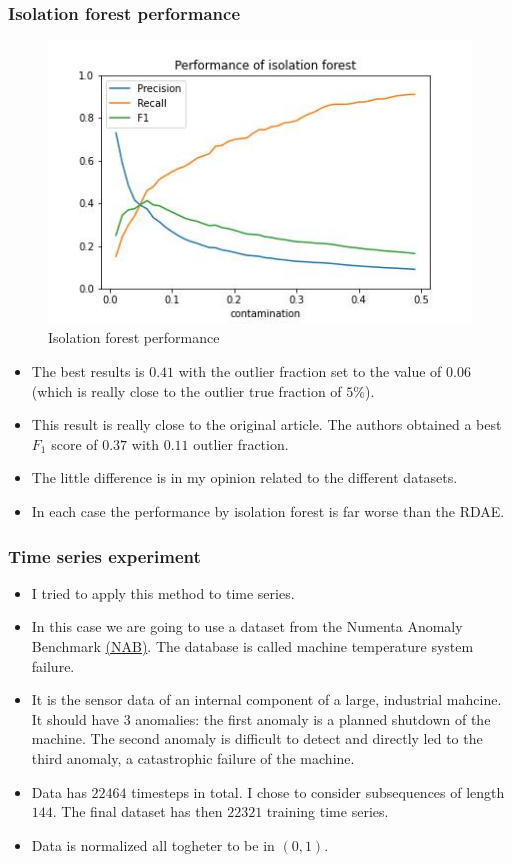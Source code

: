 \documentclass{beamer}
\theoremstyle{plain}
\theoremstyle{definition}
\theoremstyle{remark}
\begin{document}
\begin{frame}
	\frametitle{Isolation forest performance}
	\begin{figure}
		\centering
		\includegraphics[width=0.8\linewidth]{Images/isolation_forest.jpg}
		\caption[]{Isolation forest performance}
	\end{figure}
\end{frame}

\begin{frame}
	\begin{itemize}
		\item The best results is $0.41$ with the outlier fraction set to the value of $0.06$ (which is really close to the outlier true fraction of $5\%$).
		\item This result is really close to the original article. The authors obtained a best $F_1$ score of $0.37$ with $0.11$ outlier fraction.
		\item The little difference is in my opinion related to the different datasets.
		\item In each case the performance by isolation forest is far worse than the RDAE.
	\end{itemize}
\end{frame}

\begin{frame}
	\frametitle{Time series experiment}
	\begin{itemize}
		\item I tried to apply this method to time series.
		\item In this case we are going to use a dataset from the Numenta Anomaly Benchmark \hyperref{https://github.com/numenta/NAB/tree/master/data}{}{}{(NAB)}. The database is called machine temperature system failure.
		\item It is the sensor data of an internal component of a large, industrial mahcine. It should have $3$ anomalies: the first anomaly is a planned shutdown of the machine. The second anomaly is difficult to detect and directly led to the third anomaly, a catastrophic failure of the machine.
		\item Data has $22464$ timesteps in total. I chose to consider subsequences of length $144$. The final dataset has then $22321$ training time series.
		\item Data is normalized all togheter to be in $(0,1)$.
	\end{itemize}
\end{frame}
\end{document}
